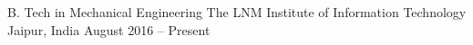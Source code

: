 \begin{cventries}
  \cventry
    {B. Tech in Mechanical Engineering}
    {The LNM Institute of Information Technology}
    {Jaipur, India}
    {August 2016 – Present}
    {}
\end{cventries}
